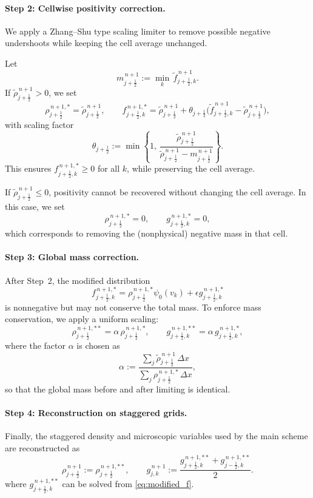 \documentclass[11pt,twoside]{article}
\theoremstyle{plain}
\theoremstyle{nonumberplain}
\begin{document}
\paragraph{Step 2: Cellwise positivity correction.}
We apply a Zhang--Shu type scaling limiter to remove possible negative undershoots while keeping the cell average unchanged.

Let
\[
    m_{j+\frac12}^{\,n+1} := \min_{k}\, \tilde{f}_{j+\frac12,k}^{\,n+1}.
\]
If $\tilde{\rho}_{j+\frac12}^{\,n+1} > 0$, we set
\[
    \rho_{j+\frac12}^{\,n+1,*} = \tilde{\rho}_{j+\frac12}^{\,n+1}, \qquad
    f_{j+\frac12,k}^{\,n+1,*}
    = \tilde{\rho}_{j+\frac12}^{\,n+1} + \theta_{j+\frac12} \big(\tilde{f}_{j+\frac12,k}^{\,n+1} - \tilde{\rho}_{j+\frac12}^{\,n+1}\big),
\]
with scaling factor
\[
    \theta_{j+\frac12}
    := \min\left\{
        1,\,
        \frac{\tilde{\rho}_{j+\frac12}^{\,n+1}}
        {\tilde{\rho}_{j+\frac12}^{\,n+1} - m_{j+\frac12}^{\,n+1}}
    \right\}.
\]
This ensures $f_{j+\frac12,k}^{\,n+1,*} \ge 0$ for all $k$, while preserving the cell average.

If $\tilde{\rho}_{j+\frac12}^{\,n+1}\le 0$, positivity cannot be recovered without changing the cell average.  
In this case, we set
\[
    \rho_{j+\frac12}^{\,n+1,*}=0,\qquad
    g_{j+\frac12,k}^{\,n+1,*}=0,
\]
which corresponds to removing the (nonphysical) negative mass in that cell.

\paragraph{Step 3: Global mass correction.}
After Step~2, the modified distribution
\begin{equation}\label{eq:modified_f}
    f_{j+\frac12,k}^{\,n+1,*}
    = \rho_{j+\frac12}^{\,n+1,*}\psi_0(v_k)
    + \epsilon g_{j+\frac12,k}^{\,n+1,*}
\end{equation}
is nonnegative but may not conserve the total mass.  
To enforce mass conservation, we apply a uniform scaling:
\[
    \rho_{j+\frac12}^{\,n+1,**} = \alpha\,\rho_{j+\frac12}^{\,n+1,*},
    \qquad
    g_{j+\frac12,k}^{\,n+1,**} = \alpha\,g_{j+\frac12,k}^{\,n+1,*},
\]
where the factor $\alpha$ is chosen as
\[
    \alpha
    := \frac{\displaystyle\sum_{j}\tilde{\rho}_{j+\frac12}^{\,n+1}\,\Delta x}
            {\displaystyle\sum_{j}\rho_{j+\frac12}^{\,n+1,*}\,\Delta x},
\]
so that the global mass before and after limiting is identical.

\paragraph{Step 4: Reconstruction on staggered grids.}
Finally, the staggered density and microscopic variables used by the main scheme are reconstructed as
\[
    \rho_{j+\frac12}^{\,n+1}
    := \rho_{j+\frac12}^{\,n+1,**},
    \qquad
    g_{j,k}^{\,n+1} := \frac{g_{j+\frac12,k}^{\,n+1,**}+g_{j-\frac12,k}^{\,n+1,**}}{2}.
\]
where $g_{j+\frac12,k}^{\,n+1,**}$ can be solved from \eqref{eq:modified_f}. 
\end{document}
